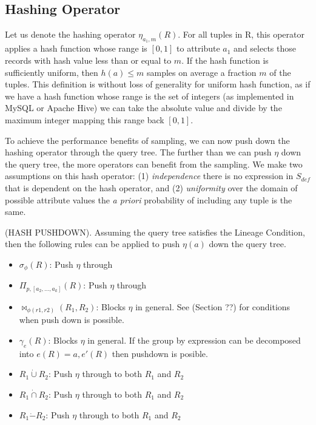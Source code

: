 \subsection{Hashing Operator}
Let us denote the hashing operator $\eta_{a_1, m}(R)$. 
For all tuples in R, this operator applies a hash function whose range is $[0,1]$ to attribute $a_1$ and selects those records with hash value less than or equal to $m$.
If the hash function is sufficiently uniform, then $h(a) \le m$ samples on average a fraction $m$ of the tuples.
This definition is without loss of generality for uniform hash function, as if we have a hash function whose range is the set of integers (as implemented in MySQL or Apache Hive) we can take the absolute value and divide by the maximum integer mapping this range back $[0,1]$. 

To achieve the performance benefits of sampling, we can now push down the hashing operator through the query tree.
The further than we can push $\eta$ down the query tree, the more operators can benefit from the sampling.
We make two assumptions on this hash operator: (1) \emph{independence} there is no expression in $S_{def}$ that is dependent on the hash operator, and (2) \emph{uniformity} over the domain of possible attribute values the \emph{a priori} probability of including any tuple is the same.

\begin{proposition}
(HASH PUSHDOWN). Assuming the query tree satisfies the Lineage Condition, then the following rules can be applied to push $\eta(a)$ down the query tree. 
\begin{itemize}\vspace{-.45em}
\item $\sigma_{\phi}(R)$: Push $\eta$ through \vspace{-.45em}
\item $\Pi_{p,[a_2,...,a_k]}(R)$: Push $\eta $ through \vspace{-.45em}
\item $\bowtie_{\phi (r1,r2)}(R_1,R_2)$: Blocks $\eta $ in general. See (Section ??) for conditions when push down is possible.
\item $\gamma_{e}(R)$: Blocks $\eta$ in general. If the group by expression can be decomposed into $e(R) = a, e'(R)$ then pushdown is posible.\vspace{-.45em}
\item $R_1 \dot{\cup} R_2$: Push $\eta $ through to both $R_1$ and $R_2$
\item $R_1 \dot{\cap} R_2$: Push $\eta $ through to both $R_1$ and $R_2$
\item $R_1 \dot{-} R_2$: Push $\eta $ through to both $R_1$ and $R_2$
\end{itemize}
\end{proposition}

